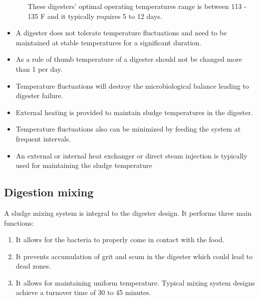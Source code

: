 \begin{itemize}
\begin{enumerate}[i.]
                                These digesters’ optimal operating temperatures range is between 113 -  135 F and it typically requires 5 to 12 days.\\
                            \end{enumerate}
                        \item A digester does not tolerate temperature fluctuations and need to be maintained at stable temperatures for a significant duration.  
                        \item As a rule of thumb temperature of a digester should not be changed more than 1 per day.
                        \item Temperature fluctuations will destroy the microbiological balance leading to digester failure.
                        \item External heating is provided to maintain sludge temperatures in the digester.
                        \item Temperature fluctuations also can be minimized by feeding the system at frequent intervals.\\
                        \item An external or internal heat exchanger or direct steam injection is typically used for maintaining the sludge temperature
                    \end{itemize}

\subsection{Digestion mixing}
            
                    A sludge mixing system is integral to the digester design.  It performs three main functions:  
                        \begin{enumerate}[1.]
                            \item It allows for the bacteria to properly come in contact with the food.  
                            \item It prevents accumulation of grit and scum in the digester which could lead to dead zones.
                            \item It allows for maintaining uniform temperature.  Typical mixing system designs achieve a turnover time of 30 to 45 minutes.
                        \end{enumerate}

